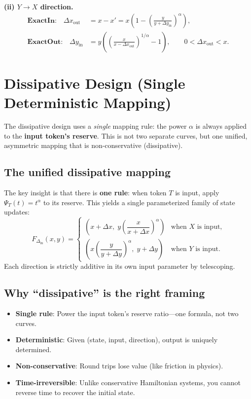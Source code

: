 \documentclass[11pt]{article}
\theoremstyle{definition}
\theoremstyle{remark}
\newcommand{\dx}{\Delta x}
\newcommand{\dy}{\Delta y}
\begin{document}
\textbf{(ii) \(Y \to X\) direction.}
\begin{align}
\textbf{ExactIn:}\quad
\dx_{\mathrm{out}}
&= x - x'
= x\left(1 - \left(\frac{y}{y+\dy_{\mathrm{in}}}\right)^{\alpha}\right),
\\[4pt]
\textbf{ExactOut:}\quad
\dy_{\mathrm{in}}
&= y\left(\left(\frac{x}{x-\dx_{\mathrm{out}}}\right)^{1/\alpha}-1\right),
\qquad 0<\dx_{\mathrm{out}}<x.
\end{align}

\section{Dissipative Design (Single Deterministic Mapping)}

The dissipative design uses a \emph{single} mapping rule: the power $\alpha$ is always applied to the \textbf{input token's reserve}.
This is not two separate curves, but one unified, asymmetric mapping that is non-conservative (dissipative).

\subsection{The unified dissipative mapping}

The key insight is that there is \textbf{one rule}: when token $T$ is input, apply $\Psi_T(t)=t^\alpha$ to its reserve.
This yields a single parameterized family of state updates:
\[
\boxed{F_{\Delta_{\mathrm{in}}}(x,y)=\begin{cases}
\left(x+\dx,\;y\left(\dfrac{x}{x+\dx}\right)^\alpha\right) & \text{when $X$ is input,}\\[1em]
\left(x\left(\dfrac{y}{y+\dy}\right)^\alpha,\;y+\dy\right) & \text{when $Y$ is input.}
\end{cases}}
\]
Each direction is strictly additive in its own input parameter by telescoping.

\subsection{Why ``dissipative'' is the right framing}

\begin{itemize}
\item \textbf{Single rule}: Power the input token's reserve ratio---one formula, not two curves.
\item \textbf{Deterministic}: Given (state, input, direction), output is uniquely determined.
\item \textbf{Non-conservative}: Round trips lose value (like friction in physics).
\item \textbf{Time-irreversible}: Unlike conservative Hamiltonian systems, you cannot reverse time to recover the initial state.
\end{itemize}
\end{document}
